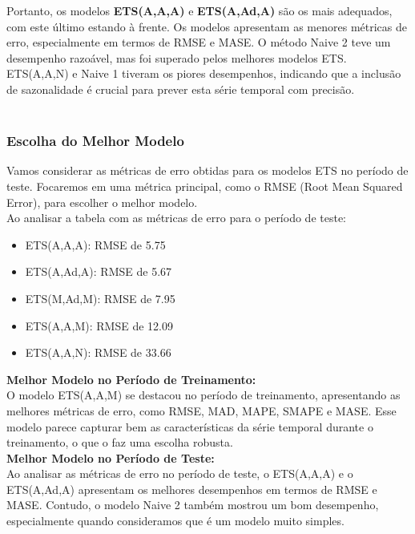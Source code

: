 \documentclass[a4paper, 12pt]{article}
\begin{document}
Portanto,  os modelos \textbf{ETS(A,A,A)} e \textbf{ETS(A,Ad,A)} são os mais adequados, com este último estando à frente. Os modelos apresentam as menores métricas de erro, especialmente em termos de RMSE e MASE.
O método Naive 2 teve um desempenho razoável, mas foi superado pelos melhores modelos ETS.
ETS(A,A,N) e Naive 1 tiveram os piores desempenhos, indicando que a inclusão de sazonalidade é crucial para prever esta série temporal com precisão.\\\\


\subsubsection{Escolha do Melhor Modelo}
Vamos considerar as métricas de erro obtidas para os modelos ETS no período de teste. Focaremos em uma métrica principal, como o RMSE (Root Mean Squared Error), para escolher o melhor modelo.\\

Ao analisar a tabela com as métricas de erro para o período de teste:

\begin{itemize}
    \item ETS(A,A,A): RMSE de 5.75
    \item ETS(A,Ad,A): RMSE de 5.67
    \item ETS(M,Ad,M): RMSE de 7.95
    \item ETS(A,A,M): RMSE de 12.09
    \item ETS(A,A,N): RMSE de 33.66
\end{itemize}

\textbf{Melhor Modelo no Período de Treinamento:} \\

O modelo ETS(A,A,M) se destacou no período de treinamento, apresentando as melhores métricas de erro, como RMSE, MAD, MAPE, SMAPE e MASE. Esse modelo parece capturar bem as características da série temporal durante o treinamento, o que o faz uma escolha robusta.\\

\textbf{Melhor Modelo no Período de Teste:}\\

Ao analisar as métricas de erro no período de teste, o ETS(A,A,A) e o ETS(A,Ad,A) apresentam os melhores desempenhos em termos de RMSE e MASE. Contudo, o modelo Naive 2 também mostrou um bom desempenho, especialmente quando consideramos que é um modelo muito simples.\\
\end{document}

